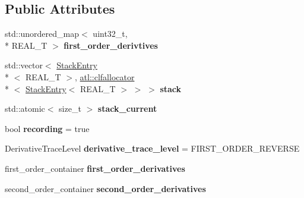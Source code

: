 \subsection*{Public Attributes}
\begin{DoxyCompactItemize}
\item 
\hypertarget{classatl_1_1_tape_a50fafd1ce08712228c92f4ca38440151}{std\+::unordered\+\_\+map$<$ uint32\+\_\+t, \\*
R\+E\+A\+L\+\_\+\+T $>$ {\bfseries first\+\_\+order\+\_\+derivtives}}\label{classatl_1_1_tape_a50fafd1ce08712228c92f4ca38440151}

\item 
\hypertarget{classatl_1_1_tape_af9f09277d29a4a1324a654b8941939c0}{std\+::vector$<$ \hyperlink{structatl_1_1_stack_entry}{Stack\+Entry}\\*
$<$ R\+E\+A\+L\+\_\+\+T $>$, \hyperlink{structatl_1_1clfallocator}{atl\+::clfallocator}\\*
$<$ \hyperlink{structatl_1_1_stack_entry}{Stack\+Entry}$<$ R\+E\+A\+L\+\_\+\+T $>$ $>$ $>$ {\bfseries stack}}\label{classatl_1_1_tape_af9f09277d29a4a1324a654b8941939c0}

\item 
\hypertarget{classatl_1_1_tape_a1865935ec7575eef6cb103422ea90a11}{std\+::atomic$<$ size\+\_\+t $>$ {\bfseries stack\+\_\+current}}\label{classatl_1_1_tape_a1865935ec7575eef6cb103422ea90a11}

\item 
\hypertarget{classatl_1_1_tape_a4687370d86d77a34775056f2ee4eb267}{bool {\bfseries recording} = true}\label{classatl_1_1_tape_a4687370d86d77a34775056f2ee4eb267}

\item 
\hypertarget{classatl_1_1_tape_a03b20777c410ed3e24d3d62a9deee7be}{Derivative\+Trace\+Level {\bfseries derivative\+\_\+trace\+\_\+level} = F\+I\+R\+S\+T\+\_\+\+O\+R\+D\+E\+R\+\_\+\+R\+E\+V\+E\+R\+S\+E}\label{classatl_1_1_tape_a03b20777c410ed3e24d3d62a9deee7be}

\item 
\hypertarget{classatl_1_1_tape_ac6ae094e22186a5b8c8084b962a0639e}{first\+\_\+order\+\_\+container {\bfseries first\+\_\+order\+\_\+derivatives}}\label{classatl_1_1_tape_ac6ae094e22186a5b8c8084b962a0639e}

\item 
\hypertarget{classatl_1_1_tape_a8ba1395fef83806c8a5ce69919185e51}{second\+\_\+order\+\_\+container {\bfseries second\+\_\+order\+\_\+derivatives}}\label{classatl_1_1_tape_a8ba1395fef83806c8a5ce69919185e51}


\end{DoxyCompactItemize}

